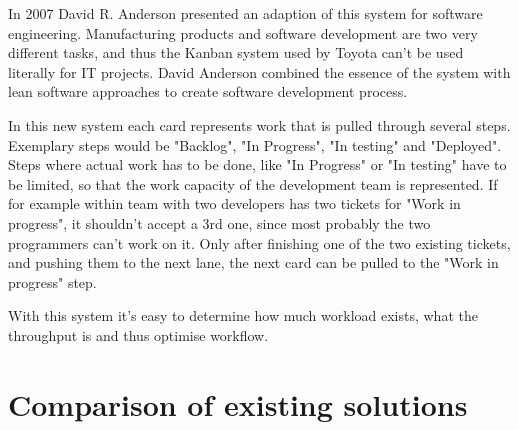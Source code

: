 In 2007 David R. Anderson presented an adaption of this system for software engineering. Manufacturing products and software development are two very different tasks, and thus the Kanban system used by Toyota can't be used literally%
 for IT projects. David Anderson combined the essence of the system with lean software approaches to create software development process. 
 
 In this new system each card represents work that is pulled through several steps. Exemplary steps would be "Backlog", "In Progress", "In testing" and "Deployed". Steps where actual work has to be done, like "In Progress" or "In testing" have to be limited, so that the work capacity of the development team is represented. If for example within team with two developers has two tickets for "Work in progress", it shouldn't accept a 3rd one, since most probably the two programmers can't work on it. Only after finishing one of the two existing tickets, and pushing them to the next lane, the next card can be pulled to the "Work in progress" step. 

With this system it's easy to determine how much workload exists, what the throughput is and thus optimise workflow.


\section{Comparison of existing solutions}


